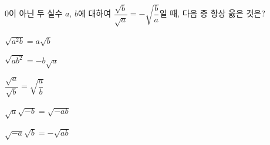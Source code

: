 $0$이 아닌 두 실수 $a$, $b$에 대하여 $\dfrac{\sqrt{b}}{\sqrt{a}}=-\sqrt{\dfrac{b}{a}}$일 때, 다음 중 항상 옳은 것은?
\begin{choicesii}{\rule[-3ex]{0pt}{8ex}$\sqrt{a^2b}=a\sqrt{b}$}{\rule[-3ex]{0pt}{8ex}$\sqrt{ab^2}=-b\sqrt{a}$}{\rule[-3ex]{0pt}{8ex}$\dfrac{\sqrt{a}}{\sqrt{b}}=\sqrt{\dfrac{a}{b}}$}{\rule[-3ex]{0pt}{8ex}$\sqrt{a}\sqrt{-b}=\sqrt{-ab}$}{\rule[-3ex]{0pt}{8ex}$\sqrt{-a}\sqrt{b}=-\sqrt{ab}$}\end{choicesii}
